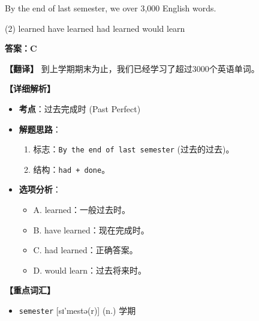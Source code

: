 \documentclass[11pt, a4paper]{article}
\newcommand{\analysis}[4]{
    \begin{solutionbox}
        \textbf{答案：#1}
        
        \textbf{【翻译】} #2
        
        \textbf{【详细解析】}
        #3
        
        \textbf{【重点词汇】}
        #4
    \end{solutionbox}
}
\newcommand{\blank}{\underline{\hspace{1.5cm}}}
\begin{document}
\begin{questions}
    \item By the end of last semester, we \blank over 3,000 English words.
    \begin{tasks}(2)
        \task learned \task have learned
        \task had learned \task would learn
    \end{tasks}
    \analysis{C}{到上学期期末为止，我们已经学习了超过3000个英语单词。}{
        \begin{itemize}
            \item \textbf{考点}：过去完成时 (Past Perfect)
            \item \textbf{解题思路}：
                \begin{enumerate}
                    \item 标志：\texttt{By the end of last semester} (过去的过去)。
                    \item 结构：\texttt{had + done}。
                \end{enumerate}
            \item \textbf{选项分析}：
                \begin{itemize}
                    \item A. learned：一般过去时。
                    \item B. have learned：现在完成时。
                    \item C. had learned：正确答案。
                    \item D. would learn：过去将来时。
                \end{itemize}
        \end{itemize}
    }{
        \begin{itemize}
            \item \texttt{semester} [sɪ'mestə(r)] (n.) 学期
        \end{itemize}
    }


\end{questions}
\end{document}
